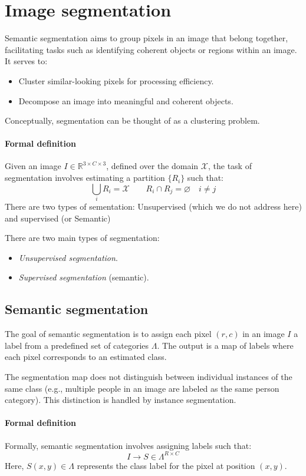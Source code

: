 \section{Image segmentation}

Semantic segmentation aims to group pixels in an image that belong together, facilitating tasks such as identifying coherent objects or regions within an image. 
It serves to:
\begin{itemize}
    \item Cluster similar-looking pixels for processing efficiency.
    \item Decompose an image into meaningful and coherent objects.
\end{itemize}
Conceptually, segmentation can be thought of as a clustering problem.

\paragraph*{Formal definition}
Given an image $I\in\mathbb{R}^{3 \times C \times 3}$, defined over the domain $\mathcal{X}$, the task of segmentation involves estimating a partition $\{R_i\}$ such that:
\[\bigcup_iR_i=\mathcal{X} \qquad R_i\cap R_j = \varnothing \quad i\neq j\]
There are two types of sementation: Unsupervised (which we do not address here) and supervised (or Semantic)

There are two main types of segmentation:
\begin{itemize}
    \item \textit{Unsupervised segmentation}. 
    \item \textit{Supervised segmentation} (semantic). 
\end{itemize}

\subsection{Semantic segmentation}
The goal of semantic segmentation is to assign each pixel $(r, c)$ in an image $I$ a label from a predefined set of categories $\varLambda$.
The output is a map of labels where each pixel corresponds to an estimated class.

The segmentation map does not distinguish between individual instances of the same class (e.g., multiple people in an image are labeled as the same person category). 
This distinction is handled by instance segmentation.

\paragraph*{Formal definition}
Formally, semantic segmentation involves assigning labels such that:
\[I\rightarrow S\in\varLambda^{R\times C}\]
Here, $S(x,y)\in \varLambda$ represents the class label for the pixel at position $(x,y)$. 

